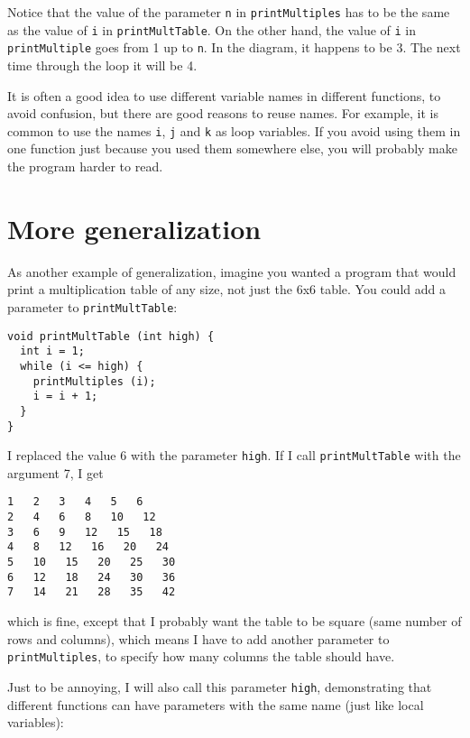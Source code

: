 \vspace{0.1in}
\centerline{}
\vspace{0.1in}
%
Notice that the value of the parameter {\tt n} in
{\tt printMultiples} has to be the same as the value
of {\tt i} in {\tt printMultTable}.  On the other hand,
the value of {\tt i} in {\tt printMultiple} goes
from 1 up to {\tt n}.  In the diagram, it happens to be 3.
The next time through the loop it will be 4.

It is often a good idea to use different variable names in
different functions, to avoid confusion, but there are good
reasons to reuse names.  For example, it is common to
use the names {\tt i}, {\tt j} and {\tt k} as loop variables.
If you avoid using them in one function just because you
used them somewhere else, you will probably make the program
harder to read.


\section{More generalization}

As another example of generalization, imagine you wanted
a program that would print a multiplication table of any
size, not just the 6x6 table.  You could add a parameter to
{\tt printMultTable}:

\begin{verbatim}
void printMultTable (int high) {
  int i = 1;
  while (i <= high) {
    printMultiples (i);
    i = i + 1;
  }
}
\end{verbatim}
%
I replaced the value 6 with the parameter {\tt high}.  If I
call {\tt printMultTable} with the argument 7, I get

\begin{verbatim}
1   2   3   4   5   6   
2   4   6   8   10   12   
3   6   9   12   15   18   
4   8   12   16   20   24   
5   10   15   20   25   30   
6   12   18   24   30   36   
7   14   21   28   35   42   
\end{verbatim}
%
which is fine, except that I probably want the table to
be square (same number of rows and columns), which means
I have to add another parameter to {\tt printMultiples},
to specify how many columns the table should have.

Just to be annoying, I will also call this parameter {\tt high},
demonstrating that different functions can have parameters
with the same name (just like local variables):

